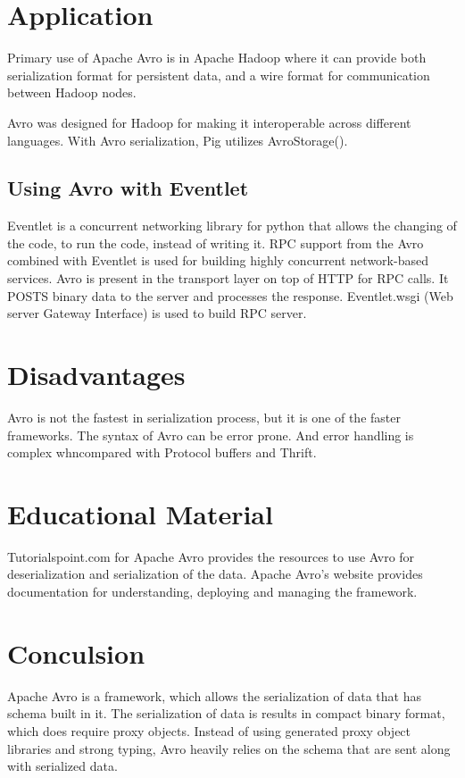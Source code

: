\documentclass[9pt,twocolumn,twoside]{../../styles/osajnl}
\begin{document}


\section{Application}

Primary use of Apache Avro is in Apache Hadoop where it can provide
both serialization format for persistent data, and a wire format for
communication between Hadoop nodes.

Avro was designed for Hadoop for making it interoperable across
different languages.  With Avro serialization, Pig utilizes
AvroStorage().

\subsection{Using Avro with Eventlet}

Eventlet\cite{www-using-avro} is a concurrent networking library for
python that allows the changing of the code, to run the code, instead
of writing it.  RPC support from the Avro combined with Eventlet is
used for building highly concurrent network-based services. Avro is
present in the transport layer on top of HTTP for RPC calls. It POSTS
binary data to the server and processes the response. Eventlet.wsgi
(Web server Gateway Interface) is used to build RPC server.

\section{Disadvantages}

Avro is not the fastest in serialization process, but it is one of the
faster frameworks.  The syntax of Avro can be error prone. And error
handling is complex whn\SP compared with Protocol buffers and Thrift.



\section{Educational Material}

Tutorialspoint.com \cite{www-tutorialspoint-avro}for Apache Avro
provides the resources to use Avro for deserialization and
serialization of the data.  Apache Avro’s \cite{www-apache-avro}
website provides documentation for understanding, deploying and
managing the framework.

\section{Conculsion}

Apache Avro is a framework, which allows the serialization of data
that has schema built in it. The serialization of data is results in
compact binary format, which does require proxy objects. Instead of
using generated proxy object libraries and strong typing, Avro heavily
relies on the schema that are sent along with serialized data.


\end{document}
